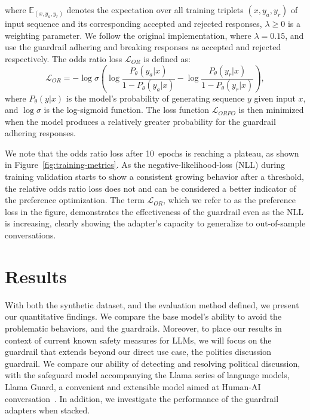 \documentclass[letterpaper]{article}
\newcommand{\finetuningEpochsDefault}{10}
\newcommand{\oddsWeight}{0.1}
\begin{document}
where $\mathbb{E}_{(x,y_a,y_r)}$ denotes the expectation over all training triplets $(x,y_a,y_r)$ of input sequence and its corresponding accepted and rejected responses, $\lambda \ge 0$ is a weighting parameter. We follow the original implementation, where $\lambda = \oddsWeight5$, and use the guardrail adhering and breaking responses as accepted and rejected respectively.  
The odds ratio loss $\mathcal{L}_{OR}$ is defined as:
\begin{equation}
	\mathcal{L}_{OR} = -\log \sigma \left(\log \frac{P_\theta(y_a|x)}{1 - P_\theta(y_a|x)} - \log \frac{P_\theta(y_r|x)}{1 - P_\theta(y_r|x)}\right),
\end{equation}
where $P_\theta(y|x)$ is the model's probability of generating sequence $y$ given input $x$, and $\log \sigma$ is the log-sigmoid function. The loss function $\mathcal{L}_{ORPO}$ is then minimized when the model produces a relatively greater probability for the guardrail adhering responses. 

We note that the odds ratio loss after \finetuningEpochsDefault~epochs is reaching a plateau, as shown in Figure~\ref{fig:training-metrics}. As the negative-likelihood-loss (NLL) during training validation starts to show a consistent growing behavior after a threshold, the relative odds ratio loss does not and can be considered a better indicator of the preference optimization.  
The term $\mathcal{L}_{OR}$, which we refer to as the preference loss in the figure, demonstrates the effectiveness of the guardrail even as the NLL is increasing, clearly showing the adapter's capacity to generalize to out-of-sample conversations.

\section{Results}
With both the synthetic dataset, and the evaluation method defined, we present our quantitative findings. We compare the base model's ability to avoid the problematic behaviors, and the guardrails. Moreover, to place our results in context of current known safety measures for LLMs, we will focus on the guardrail that extends beyond our direct use case, the politics discussion guardrail. We compare our ability of detecting and resolving political discussion, with the safeguard model accompanying the Llama series of language models, Llama Guard, a convenient and extensible model aimed at Human-AI conversation~\cite{inan2023llama}. In addition, we investigate the performance of the guardrail adapters when stacked.
\end{document}
